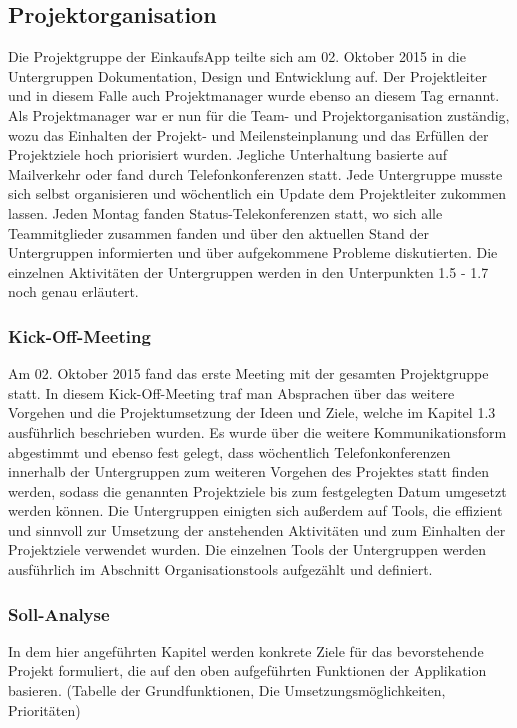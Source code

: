 \documentclass[12pt,a4paper]{article}
\begin{document}
\subsection{Projektorganisation}
Die Projektgruppe der EinkaufsApp teilte sich am 02. Oktober 2015 in die Untergruppen Dokumentation, Design und Entwicklung auf.
Der Projektleiter und in diesem Falle auch Projektmanager wurde ebenso an diesem Tag ernannt.
Als Projektmanager war er nun für die Team- und Projektorganisation zuständig, wozu das Einhalten der Projekt- und Meilensteinplanung  und das Erfüllen der Projektziele hoch priorisiert wurden.
Jegliche Unterhaltung basierte auf Mailverkehr oder fand durch Telefonkonferenzen statt. Jede Untergruppe musste sich selbst organisieren und wöchentlich ein Update dem Projektleiter zukommen lassen. Jeden Montag fanden Status-Telekonferenzen statt, wo sich alle Teammitglieder zusammen fanden und über den aktuellen Stand der Untergruppen informierten und über aufgekommene Probleme diskutierten. Die einzelnen Aktivitäten der Untergruppen werden in den Unterpunkten  1.5 - 1.7 noch genau erläutert.


\subsubsection{Kick-Off-Meeting}
Am 02. Oktober  2015 fand das erste Meeting mit der gesamten Projektgruppe statt. In diesem Kick-Off-Meeting traf man Absprachen über das weitere Vorgehen und die Projektumsetzung der Ideen und Ziele, welche im Kapitel 1.3 ausführlich beschrieben wurden. Es wurde über die weitere Kommunikationsform abgestimmt und ebenso fest gelegt, dass wöchentlich Telefonkonferenzen innerhalb der Untergruppen zum weiteren Vorgehen des Projektes statt finden werden, sodass die genannten Projektziele bis zum festgelegten Datum umgesetzt werden können. 
Die Untergruppen einigten sich außerdem auf Tools, die effizient und sinnvoll zur Umsetzung der anstehenden Aktivitäten und zum Einhalten der Projektziele verwendet wurden. Die einzelnen Tools der Untergruppen werden ausführlich im Abschnitt Organisationstools aufgezählt und definiert.
\newpage

\subsubsection{Soll-Analyse}
In dem hier angeführten Kapitel werden konkrete Ziele für das bevorstehende Projekt formuliert, die auf den oben aufgeführten Funktionen der Applikation basieren. (Tabelle der Grundfunktionen, Die Umsetzungsmöglichkeiten, Prioritäten)
\end{document}
